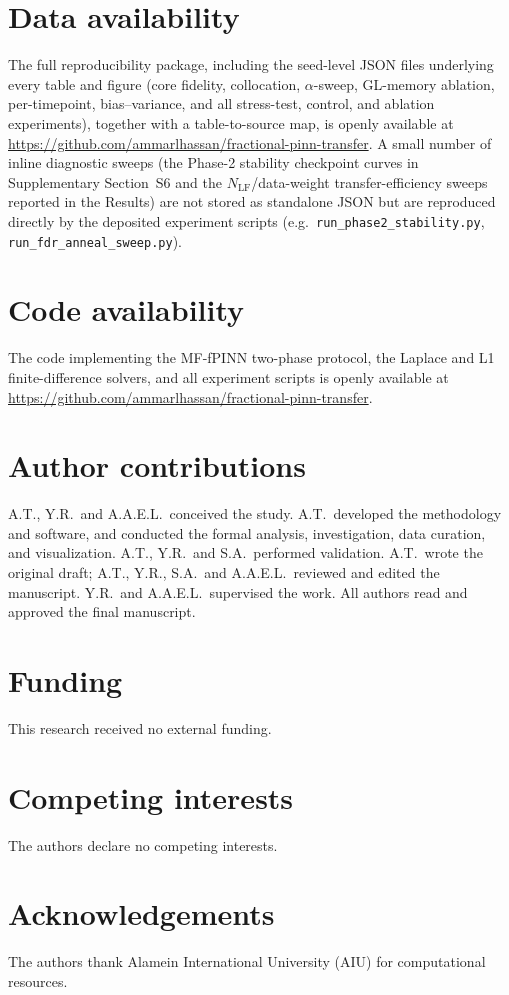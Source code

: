 \documentclass[11pt]{article}
\newcommand{\NLF}{N_{\mathrm{LF}}}
\begin{document}
\section*{Data availability}
The full reproducibility package, including the seed-level JSON files underlying every table and figure (core fidelity, collocation, $\alpha$-sweep, GL-memory ablation, per-timepoint, bias--variance, and all stress-test, control, and ablation experiments), together with a table-to-source map, is openly available at \url{https://github.com/ammarlhassan/fractional-pinn-transfer}. A small number of inline diagnostic sweeps (the Phase-2 stability checkpoint curves in Supplementary Section~S6 and the $\NLF$/data-weight transfer-efficiency sweeps reported in the Results) are not stored as standalone JSON but are reproduced directly by the deposited experiment scripts (e.g.\ \texttt{run\_phase2\_stability.py}, \texttt{run\_fdr\_anneal\_sweep.py}).

\section*{Code availability}
The code implementing the MF-fPINN two-phase protocol, the Laplace and L1 finite-difference solvers, and all experiment scripts is openly available at \url{https://github.com/ammarlhassan/fractional-pinn-transfer}.

\section*{Author contributions}
A.T., Y.R.\ and A.A.E.L.\ conceived the study. A.T.\ developed the methodology and software, and conducted the formal analysis, investigation, data curation, and visualization. A.T., Y.R.\ and S.A.\ performed validation. A.T.\ wrote the original draft; A.T., Y.R., S.A.\ and A.A.E.L.\ reviewed and edited the manuscript. Y.R.\ and A.A.E.L.\ supervised the work. All authors read and approved the final manuscript.

\section*{Funding}
This research received no external funding.

\section*{Competing interests}
The authors declare no competing interests.

\section*{Acknowledgements}
The authors thank Alamein International University (AIU) for computational resources.



\end{document}
